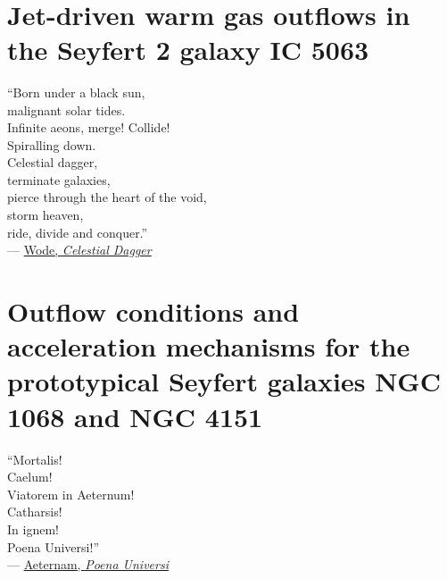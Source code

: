\documentclass[12pt, twoside, openright]{report}
\begin{document}
\newpage
\thispagestyle{plain}
~\newpage

\chapter{Jet-driven warm gas outflows in the Seyfert 2 galaxy IC 5063}
\label{chapter: xshooter_ic5063}

\vspace*{2cm}
\vbox{\large``Born under a black sun, \\
malignant solar tides. \\
Infinite aeons, merge! Collide! \\
Spiralling down. \\

\noindent
Celestial dagger, \\
terminate galaxies, \\
pierce through the heart of the void, \\
storm heaven, \\
ride, divide and conquer.''\\

--- \href{https://wode.bandcamp.com/album/servants-of-the-countercosmos}{Wode, \textit{Celestial Dagger}}}
\newpage
\noindent



\chapter{Outflow conditions and acceleration mechanisms for the prototypical Seyfert galaxies NGC 1068 and NGC 4151}
\label{chapter: stis_seyferts}

\vspace*{2cm}
\vbox{\large``Mortalis!\\
Caelum!\\
Viatorem in Aeternum!\\
Catharsis!\\
In ignem! \\
Poena Universi!''\\


--- \href{https://aeternam.bandcamp.com/album/al-qassam}{Aeternam, \textit{Poena Universi}}}

\newpage
\noindent


\newpage
\thispagestyle{plain}
~\newpage
\end{document}
